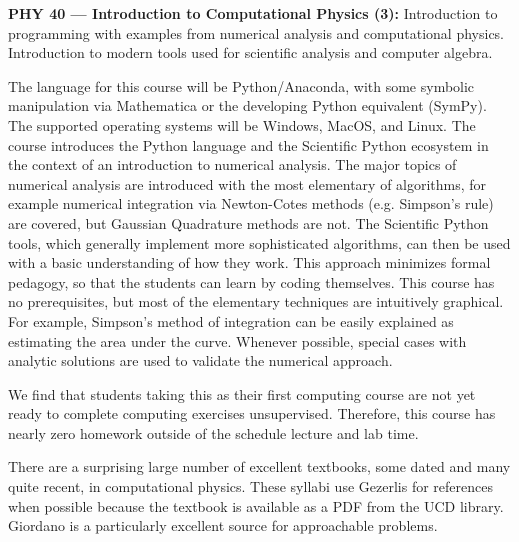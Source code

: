 \documentclass[12pt]{article}
\begin{document}
\vskip 1cm
\noindent
{\bf PHY 40 --- Introduction to Computational Physics (3):}
Introduction to programming with examples from numerical analysis and
computational physics. Introduction to modern tools used for
scientific analysis and computer algebra.

The language for this course will be Python/Anaconda, with some
symbolic manipulation via Mathematica or the developing Python
equivalent (SymPy).  The supported operating systems will be Windows,
MacOS, and Linux.  The course introduces the Python language and the
Scientific Python ecosystem in the context of an introduction to
numerical analysis.  The major topics of numerical analysis are
introduced with the most elementary of algorithms, for example
numerical integration via Newton-Cotes methods (e.g. Simpson's rule)
are covered, but Gaussian Quadrature methods are not.  The Scientific
Python tools, which generally implement more sophisticated algorithms,
can then be used with a basic understanding of how they work.  This
approach minimizes formal pedagogy, so that the students can learn by
coding themselves.  This course has no prerequisites, but most of the
elementary techniques are intuitively graphical.  For example,
Simpson's method of integration can be easily explained as estimating
the area under the curve.  Whenever possible, special cases with
analytic solutions are used to validate the numerical approach.

We find that students taking this as their first computing course are
not yet ready to complete computing exercises unsupervised.
Therefore, this course has nearly zero homework outside of the
schedule lecture and lab time.

There are a surprising large number of excellent textbooks, some dated
and many quite recent, in computational physics.  These syllabi use
Gezerlis for references when possible because the textbook is
available as a PDF from the UCD library.  Giordano is a particularly
excellent source for approachable problems.
\end{document}
